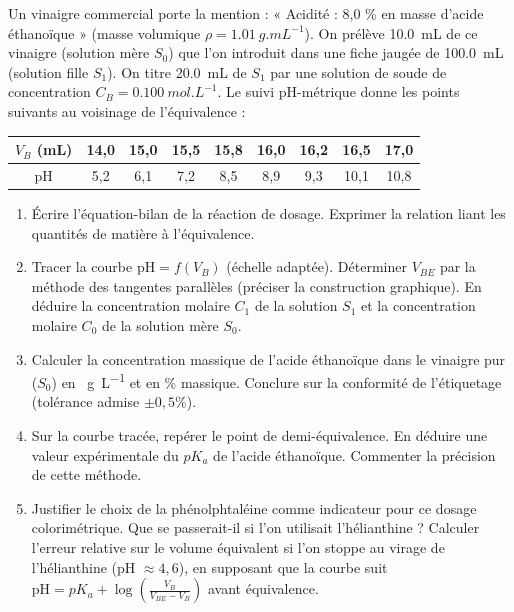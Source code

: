 \documentclass[11pt]{article}
\begin{document}
\begin{exercice}
Un vinaigre commercial porte la mention : « Acidité : 8,0 \% en masse d'acide éthanoïque » (masse volumique $\rho = \SI{1,01}{g.mL^{-1}}$).
On prélève \SI{10,0}{mL} de ce vinaigre (solution mère $S_0$) que l'on introduit dans une fiche jaugée de \SI{100,0}{mL} (solution fille $S_1$). On titre \SI{20,0}{mL} de $S_1$ par une solution de soude  de concentration $C_B = \SI{0,100}{mol.L^{-1}}$.
Le suivi pH-métrique donne les points suivants au voisinage de l'équivalence :
\begin{center}
\begin{tabular}{c|cccccccc}
$V_B$ (mL) & 14,0 & 15,0 & 15,5 & 15,8 & 16,0 & 16,2 & 16,5 & 17,0 \\
\hline
pH & 5,2 & 6,1 & 7,2 & 8,5 & 8,9 & 9,3 & 10,1 & 10,8
\end{tabular}
\end{center}
\begin{enumerate}
    \item Écrire l'équation-bilan de la réaction de dosage. Exprimer la relation liant les quantités de matière à l'équivalence.
    \item Tracer la courbe $\text{pH} = f(V_B)$ (échelle adaptée). Déterminer $V_{BE}$ par la méthode des tangentes parallèles (préciser la construction graphique). En déduire la concentration molaire $C_1$ de la solution $S_1$ et la concentration molaire $C_0$ de la solution mère $S_0$.
    \item Calculer la concentration massique de l'acide éthanoïque dans le vinaigre pur ($S_0$) en \SI{}{g.L^{-1}} et en \% massique. Conclure sur la conformité de l'étiquetage (tolérance admise $\pm 0,5\%$).
    \item Sur la courbe tracée, repérer le point de demi-équivalence. En déduire une valeur expérimentale du $pK_a$ de l'acide éthanoïque. Commenter la précision de cette méthode.
    \item Justifier le choix de la phénolphtaléine comme indicateur pour ce dosage colorimétrique. Que se passerait-il si l'on utilisait l'hélianthine ? Calculer l'erreur relative sur le volume équivalent si l'on stoppe au virage de l'hélianthine (pH $\approx 4,6$), en supposant que la courbe suit $\text{pH} = pK_a + \log(\frac{V_B}{V_{BE}-V_B})$ avant équivalence.
\end{enumerate}
\end{exercice}
\end{document}
